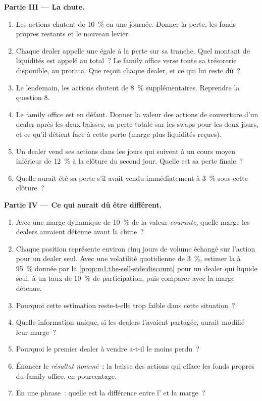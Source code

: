 \begin{problem}
\medskip\noindent\textbf{Partie III --- La chute.}
\begin{enumerate}[resume]
\item Les actions chutent de 10~\% en une journée. Donner la perte, les fonds propres restants et
le nouveau levier.
\item Chaque dealer appelle une  égale à la perte sur sa tranche.
Quel montant de liquidités est appelé au total~? Le family office verse toute sa
trésorerie disponible, au prorata. Que reçoit chaque dealer, et ce qui lui reste dû~?
\item Le lendemain, les actions chutent de 8~\% supplémentaires. Reprendre la question 8.
\item Le family office est en défaut. Donner la valeur des actions de couverture d'un dealer
après les deux baisses, sa perte totale sur les swaps pour les deux jours, et
ce qu'il détient face à cette perte (marge plus liquidités reçues).
\item Un dealer vend ses actions dans les jours qui suivent à un cours moyen inférieur de 12~\%
à la clôture du second jour. Quelle est sa perte finale~?
\item Quelle aurait été sa perte s'il avait vendu immédiatement à 3~\% sous
cette clôture~?
\end{enumerate}

\medskip\noindent\textbf{Partie IV --- Ce qui aurait dû être différent.}
\begin{enumerate}[resume]
\item Avec une marge dynamique de 10~\% de la valeur \emph{courante}, quelle marge
les dealers auraient détenue avant la chute~?
\item Chaque position représente environ cinq jours de volume échangé sur l'action pour un
dealer seul. Avec une volatilité quotidienne de 3~\%, estimer la  à 95~\% donnée par
la \cref{prop:m1:the-sell-side:discount} pour un dealer qui liquide seul, à un taux de 10~\%
de participation, puis comparer avec la marge détenue.
\item Pourquoi cette estimation reste-t-elle trop faible dans cette situation~?
\item Quelle information unique, si les dealers l'avaient partagée, aurait
modifié leur marge~?
\item Pourquoi le premier dealer à vendre a-t-il le moins perdu~?
\item Énoncer le \emph{résultat nommé}~: la baisse des actions qui efface
les fonds propres du family office, en pourcentage.
\item En une phrase~: quelle est la différence entre l' et la marge~?
\end{enumerate}
\end{problem}


